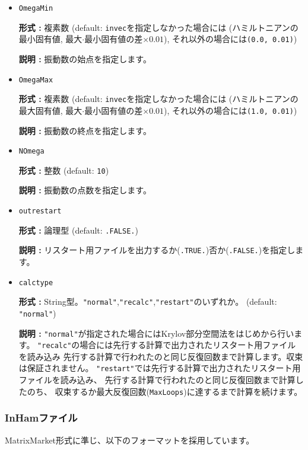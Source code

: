 \documentclass[12pt,titlepage]{jarticle}
\begin{document}
\begin{itemize}
\item  \verb|OmegaMin|
  
  {\bf 形式 :} 複素数 (default: \verb|invec|を指定しなかった場合には
  (ハミルトニアンの最小固有値, 最大$\cdot$最小固有値の差$\times0.01$),
  それ以外の場合には\verb|(0.0, 0.01)|)

  {\bf 説明 :} 振動数の始点を指定します。
  
\item  \verb|OmegaMax|
  
  {\bf 形式 :} 複素数 (default: \verb|invec|を指定しなかった場合には
  (ハミルトニアンの最大固有値, 最大$\cdot$最小固有値の差$\times0.01$),
  それ以外の場合には\verb|(1.0, 0.01)|)

  {\bf 説明 :} 振動数の終点を指定します。
  
\item  \verb|NOmega|
  
  {\bf 形式 :} 整数 (default: \verb|10|)

  {\bf 説明 :} 振動数の点数を指定します。
  
\item \verb|outrestart|
  
  {\bf 形式 :} 論理型 (default: \verb|.FALSE.|)

  {\bf 説明 :} リスタート用ファイルを出力するか(\verb|.TRUE.|)否か(\verb|.FALSE.|)を指定します。

\item  \verb|calctype|
  
  {\bf 形式 :} String型。\verb|"normal"|,\verb|"recalc"|,\verb|"restart"|のいずれか。
  (default: \verb|"normal"|)

  {\bf 説明 :} \verb|"normal"|が指定された場合にはKrylov部分空間法をはじめから行います。
  \verb|"recalc"|の場合には先行する計算で出力されたリスタート用ファイルを読み込み
  先行する計算で行われたのと同じ反復回数まで計算します。収束は保証されません。
  \verb|"restart"|では先行する計算で出力されたリスタート用ファイルを読み込み、
  先行する計算で行われたのと同じ反復回数まで計算したのち、
  収束するか最大反復回数(\verb|MaxLoops|)に達するまで計算を続けます。

\end{itemize} 
  
\newpage
\subsubsection{InHamファイル} \label{subsubsec:ham}
MatrixMarket形式に準じ、以下のフォーマットを採用しています。\\
\end{document}
